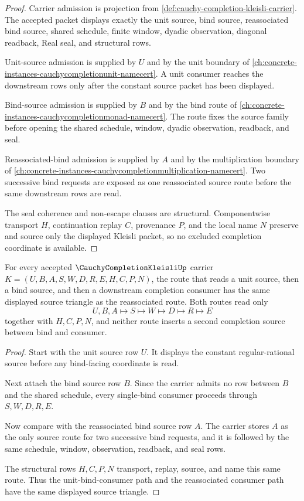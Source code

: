 \begin{proof}
Carrier admission is projection from \autoref{def:cauchy-completion-kleisli-carrier}. The accepted packet displays exactly the unit source, bind source, reassociated bind source, shared schedule, finite window, dyadic observation, diagonal readback, Real seal, and structural rows.

Unit-source admission is supplied by $U$ and by the unit boundary of \autoref{ch:concrete-instances-cauchycompletionunit-namecert}. A unit consumer reaches the downstream rows only after the constant source packet has been displayed.

Bind-source admission is supplied by $B$ and by the bind route of \autoref{ch:concrete-instances-cauchycompletionmonad-namecert}. The route fixes the source family before opening the shared schedule, window, dyadic observation, readback, and seal.

Reassociated-bind admission is supplied by $A$ and by the multiplication boundary of \autoref{ch:concrete-instances-cauchycompletionmultiplication-namecert}. Two successive bind requests are exposed as one reassociated source route before the same downstream rows are read.

The seal coherence and non-escape clauses are structural. Componentwise transport $H$, continuation replay $C$, provenance $P$, and the local name $N$ preserve and source only the displayed Kleisli packet, so no excluded completion coordinate is available.
\end{proof}

\begin{theorem}
\label{thm:cauchy-completion-kleisli-source-triangle}
For every accepted $\CauchyCompletionKleisliUp$ carrier $K=(U,B,A,S,W,D,R,E,H,C,P,N)$, the route that reads a unit source, then a bind source, and then a downstream completion consumer has the same displayed source triangle as the reassociated route. Both routes read only
$$
U,B,A \longmapsto S \longmapsto W \longmapsto D \longmapsto R \longmapsto E
$$
together with $H,C,P,N$, and neither route inserts a second completion source between bind and consumer.
\end{theorem}
\begin{proof}
Start with the unit source row $U$. It displays the constant regular-rational source before any bind-facing coordinate is read.

Next attach the bind source row $B$. Since the carrier admits no row between $B$ and the shared schedule, every single-bind consumer proceeds through $S,W,D,R,E$.

Now compare with the reassociated bind source row $A$. The carrier stores $A$ as the only source route for two successive bind requests, and it is followed by the same schedule, window, observation, readback, and seal rows.

The structural rows $H,C,P,N$ transport, replay, source, and name this same route. Thus the unit-bind-consumer path and the reassociated consumer path have the same displayed source triangle.
\end{proof}

